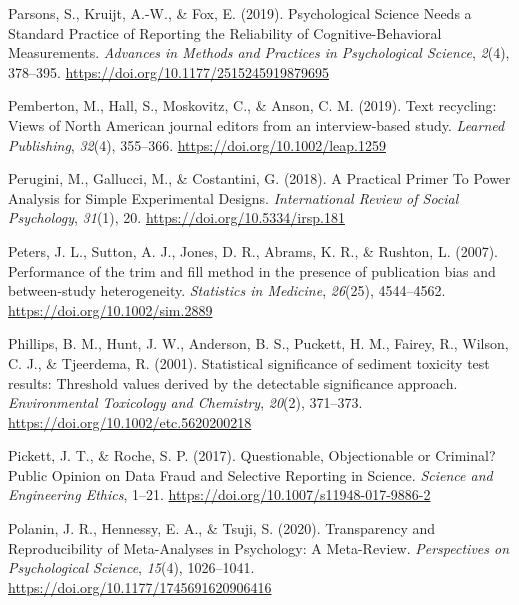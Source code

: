 \documentclass[
  letterpaper,
  DIV=11,
  numbers=noendperiod]{scrreprt}
\newlength{\cslhangindent}
\newlength{\cslentryspacingunit} %
\newenvironment{CSLReferences}[2] %
 {%
  \setlength{\parindent}{0pt}
  \ifodd #1
  \let\oldpar\par
  \def\par{\hangindent=\cslhangindent\oldpar}
  \fi
  \setlength{\parskip}{#2\cslentryspacingunit}
 }%
 {}
\begin{document}
\begin{CSLReferences}{1}{0}
\leavevmode{}%
Parsons, S., Kruijt, A.-W., \& Fox, E. (2019). Psychological {Science
Needs} a {Standard Practice} of {Reporting} the {Reliability} of
{Cognitive-Behavioral Measurements}. \emph{Advances in Methods and
Practices in Psychological Science}, \emph{2}(4), 378--395.
\url{https://doi.org/10.1177/2515245919879695}

\leavevmode{}%
Pemberton, M., Hall, S., Moskovitz, C., \& Anson, C. M. (2019). Text
recycling: {Views} of {North American} journal editors from an
interview-based study. \emph{Learned Publishing}, \emph{32}(4),
355--366. \url{https://doi.org/10.1002/leap.1259}

\leavevmode{}%
Perugini, M., Gallucci, M., \& Costantini, G. (2018). A {Practical
Primer To Power Analysis} for {Simple Experimental Designs}.
\emph{International Review of Social Psychology}, \emph{31}(1), 20.
\url{https://doi.org/10.5334/irsp.181}

\leavevmode{}%
Peters, J. L., Sutton, A. J., Jones, D. R., Abrams, K. R., \& Rushton,
L. (2007). Performance of the trim and fill method in the presence of
publication bias and between-study heterogeneity. \emph{Statistics in
Medicine}, \emph{26}(25), 4544--4562.
\url{https://doi.org/10.1002/sim.2889}

\leavevmode{}%
Phillips, B. M., Hunt, J. W., Anderson, B. S., Puckett, H. M., Fairey,
R., Wilson, C. J., \& Tjeerdema, R. (2001). Statistical significance of
sediment toxicity test results: {Threshold} values derived by the
detectable significance approach. \emph{Environmental Toxicology and
Chemistry}, \emph{20}(2), 371--373.
\url{https://doi.org/10.1002/etc.5620200218}

\leavevmode{}%
Pickett, J. T., \& Roche, S. P. (2017). Questionable, {Objectionable} or
{Criminal}? {Public Opinion} on {Data Fraud} and {Selective Reporting}
in {Science}. \emph{Science and Engineering Ethics}, 1--21.
\url{https://doi.org/10.1007/s11948-017-9886-2}

\leavevmode{}%
Polanin, J. R., Hennessy, E. A., \& Tsuji, S. (2020). Transparency and
{Reproducibility} of {Meta-Analyses} in {Psychology}: {A Meta-Review}.
\emph{Perspectives on Psychological Science}, \emph{15}(4), 1026--1041.
\url{https://doi.org/10.1177/1745691620906416}


\end{CSLReferences}
\end{document}
